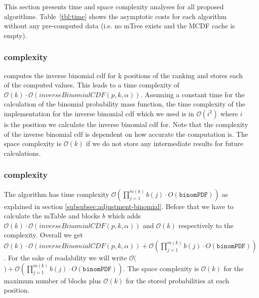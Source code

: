 This section presents time and space complexity analyses for all proposed algorithms. 
%
Table~\ref{tbl:time} shows the asymptotic costs for each algorithm without any pre-computed data (i.e. no mTree exists and the MCDF cache is empty).
%
\subsubsection{\algoMtable complexity}\label{subsubsec:construct-mtable-complexity}
\algoMtable computes the inverse binomial cdf for k positions of the ranking and stores each of the computed values. 
%
This leads to a time complexity of $\mathcal{O}(k) \cdot \mathcal{O}(inverseBinomialCDF(p,k,\alpha))$.  Assuming a constant time for the calculation of the binomial probability mass function, the time complexity of the implementation for the inverse binomial cdf which we used is in $\mathcal{O}(i^2)$ where $i$ is the position we calculate the inverse binomial cdf for.
%
Note that the complexity of the inverse binomial cdf is dependent on how accurate the computation is. 
%
The space complexity is $\mathcal{O}(k)$ if we do not store any intermediate results for future calculations.
%
\subsubsection{\algoRecursive complexity}\label{subsubsec:success-prob-complexity}
The algorithm \algoRecursive has time complexity $\mathcal{O}(\prod_{j=1}^{m(k)}b(j) \cdot O(\texttt{binomPDF}))$ as explained in section \ref{subsubsec:adjustment-binomial}. 
%
Before that we have to calculate the mTable and blocks $b$ which adds $\mathcal{O}(k) \cdot \mathcal{O}(inverseBinomialCDF(p,k,\alpha))$ and $\mathcal{O}(k)$ respectively to the complexity. 
%
Overall we get $\mathcal{O}(k) \cdot \mathcal{O}(inverseBinomialCDF(p,k,\alpha)) + \mathcal{O}(\prod_{j=1}^{m(k)}b(j) \cdot O(\texttt{binomPDF}))$. 
%
For the sake of readability we will write $\mathcal{O}($\algoMtable$) + \mathcal{O}(\prod_{j=1}^{m(k)}b(j) \cdot O(\texttt{binomPDF}))$.
%
The space complexity is $\mathcal{O}(k)$ for the maximum number of blocks plus $\mathcal{O}(k)$ for the stored probabilities at each position.
%
